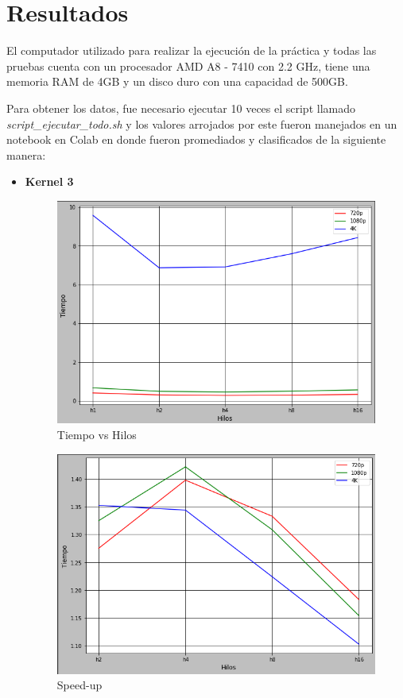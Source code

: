 \documentclass[a4paper,10pt]{IEEEtran}
\begin{document}
\section{Resultados}

El computador utilizado para realizar la ejecuci\'on de la pr\'actica y todas las pruebas cuenta con un procesador AMD A8 - 7410 con 2.2 GHz, tiene una memoria RAM de 4GB y un disco duro con una capacidad de 500GB.

Para obtener los datos, fue necesario ejecutar 10 veces el script llamado \textit{script\_ejecutar\_todo.sh} y los valores arrojados por este fueron manejados en un notebook en Colab \cite{01} en donde fueron promediados y clasificados de la siguiente manera:


\begin{itemize}
    \item \textbf{Kernel 3} 
        \begin{figure}[H]
            \centering
            \includegraphics[scale = 0.3]{images/k3.png}
            \caption{Tiempo vs Hilos}
            \label{f00}
        \end{figure}{}
        
        \begin{figure}[H]
            \centering
            \includegraphics[scale = 0.3]{images/k3s.png}
            \caption{Speed-up}
            \label{f00a}
        \end{figure}{}
        

\end{itemize}
\end{document}
